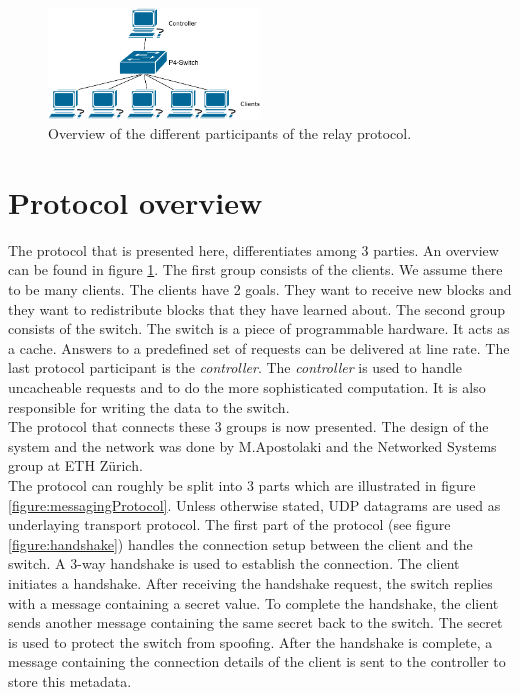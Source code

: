 \begin{figure}[bt]
  \begin{center}
	\includegraphics[width=0.5\textwidth]{Figures/DesignOverview}
  \caption{Overview of the different participants of the relay protocol.}
  \label{fig:setup:overview}
  \end{center}
\end{figure}

\section{Protocol overview \label{sec:functional_overview}}
The protocol that is presented here, differentiates among 3 parties. An overview can be found in figure \ref{fig:setup:overview}. The first group consists of the clients. We assume there to be many clients. The clients have 2 goals. They want to receive new blocks and they want to redistribute blocks that they have learned about. The second group consists of the switch. The switch is a piece of programmable hardware. It acts as a cache. Answers to a predefined set of requests can be delivered at line rate. The last protocol participant is the \textit{controller}. The \textit{controller} is used to handle uncacheable requests and to do the more sophisticated computation. It is also responsible for writing the data to the switch.\\
The protocol that connects these 3 groups is now presented. The design of the system and the network was done by M.Apostolaki and the Networked Systems group at ETH Zürich.\\
The protocol can roughly be split into 3 parts which are illustrated in figure \ref{figure:messagingProtocol}. Unless otherwise stated, UDP datagrams are used as underlaying transport protocol. The first part of the protocol (see figure \ref{figure:handshake}) handles the connection setup between the client and the switch. A 3-way handshake is used to establish the connection. The client initiates a handshake. After receiving the handshake request, the switch replies with a message containing a secret value. To complete the handshake, the client sends another message containing the same secret back to the switch. The secret is used to protect the switch from spoofing. After the handshake is complete, a message containing the connection details of the client is sent to the controller to store this metadata.\\
